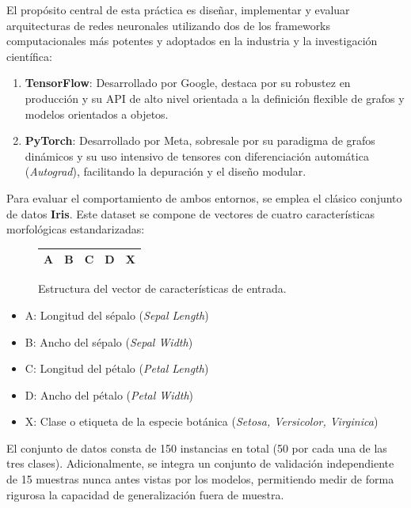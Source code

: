 \documentclass[12pt]{article}
\begin{document}
	El propósito central de esta práctica es diseñar, implementar y evaluar arquitecturas de redes neuronales utilizando dos de los frameworks computacionales más potentes y adoptados en la industria y la investigación científica:
	\begin{enumerate}
		\item \textbf{TensorFlow}: Desarrollado por Google, destaca por su robustez en producción y su API de alto nivel orientada a la definición flexible de grafos y modelos orientados a objetos.
		\item \textbf{PyTorch}: Desarrollado por Meta, sobresale por su paradigma de grafos dinámicos y su uso intensivo de tensores con diferenciación automática (\textit{Autograd}), facilitando la depuración y el diseño modular.
	\end{enumerate}
	
	Para evaluar el comportamiento de ambos entornos, se emplea el clásico conjunto de datos \textbf{Iris}. Este dataset se compone de vectores de cuatro características morfológicas estandarizadas:
	
	\begin{figure}[h!]
		\centering
		\begin{tabular}{|c|c|c|c|c|}
			\hline
			A & B & C & D & X \\
			\hline
		\end{tabular}
		\caption{Estructura del vector de características de entrada.}
		\label{fig:vector_caracteristicas}
	\end{figure}
	
	\begin{itemize}
		\item A: Longitud del sépalo (\textit{Sepal Length}) 	
		\item B: Ancho del sépalo (\textit{Sepal Width}) 
		\item C: Longitud del pétalo (\textit{Petal Length})
		\item D: Ancho del pétalo (\textit{Petal Width})
		\item X: Clase o etiqueta de la especie botánica (\textit{Setosa, Versicolor, Virginica})
	\end{itemize}
	
	El conjunto de datos consta de 150 instancias en total (50 por cada una de las tres clases). Adicionalmente, se integra un conjunto de validación independiente de 15 muestras nunca antes vistas por los modelos, permitiendo medir de forma rigurosa la capacidad de generalización fuera de muestra.
	
\end{document}
